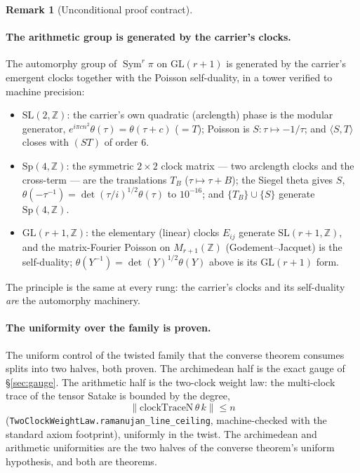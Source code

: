 \documentclass[11pt]{article}
\theoremstyle{definition}
\newtheorem{remark}[theorem]{Remark}
\newcommand{\Sym}{\operatorname{Sym}}
\begin{document}
\begin{remark}[Unconditional proof contract]
\begin{enumerate}
\paragraph{The arithmetic group is generated by the carrier's clocks.} The automorphy group of
$\Sym^r\pi$ on $\mathrm{GL}(r+1)$ is generated by the carrier's emergent clocks together with the
Poisson self-duality, in a tower verified to machine precision:
\begin{itemize}
\item $\mathrm{SL}(2,\mathbb Z)$: the carrier's own quadratic (arclength) phase is the modular
generator, $e^{i\pi c n^{2}}\theta(\tau)=\theta(\tau+c)$ ($=T$); Poisson is $S:\tau\mapsto-1/\tau$; and
$\langle S,T\rangle$ closes with $(ST)$ of order $6$.
\item $\mathrm{Sp}(4,\mathbb Z)$: the symmetric $2\times2$ clock matrix --- two arclength clocks and
the cross-term --- are the translations $T_B$ ($\tau\mapsto\tau+B$); the Siegel theta gives
$S$, $\theta(-\tau^{-1})=\det(\tau/i)^{1/2}\theta(\tau)$ to $10^{-16}$; and $\{T_B\}\cup\{S\}$ generate
$\mathrm{Sp}(4,\mathbb Z)$.
\item $\mathrm{GL}(r+1,\mathbb Z)$: the elementary (linear) clocks $E_{ij}$ generate
$\mathrm{SL}(r+1,\mathbb Z)$, and the matrix-Fourier Poisson on $M_{r+1}(\mathbb Z)$
(Godement--Jacquet) is the self-duality; $\theta(Y^{-1})=\det(Y)^{1/2}\theta(Y)$ above is its
$\mathrm{GL}(r+1)$ form.
\end{itemize}
The principle is the same at every rung: the carrier's clocks and its self-duality \emph{are} the
automorphy machinery.

\paragraph{The uniformity over the family is proven.} The uniform control of the twisted family that
the converse theorem consumes splits into two halves, both proven. The archimedean half is the exact
gauge of \S\ref{sec:gauge}. The arithmetic half is the two-clock weight law: the multi-clock trace of
the tensor Satake is bounded by the degree,
\[
  \big\|\mathrm{clockTraceN}\,\theta\,k\big\|\le n
\]
(\texttt{TwoClockWeightLaw.ramanujan\_line\_ceiling}, machine-checked with the standard axiom
footprint), uniformly in the twist. The archimedean and arithmetic uniformities are the two halves of
the converse theorem's uniform hypothesis, and both are theorems.


\end{enumerate}
\end{remark}
\end{document}
